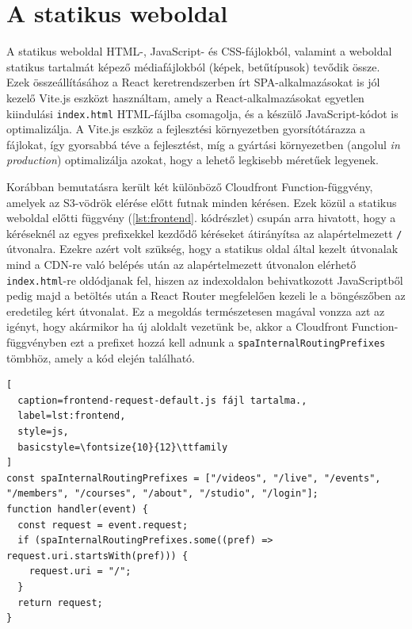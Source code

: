 \section{A statikus weboldal}

A statikus weboldal HTML-, JavaScript- és CSS-fájlokból, valamint a weboldal statikus tartalmát képező médiafájlokból (képek, betűtípusok) tevődik össze. Ezek összeállításához a React keretrendszerben írt SPA-alkalmazásokat is jól kezelő Vite.js eszközt használtam, amely a React-alkalmazásokat egyetlen kiindulási \verb|index.html| HTML-fájlba csomagolja, és a készülő JavaScript-kódot is optimalizálja. A Vite.js eszköz a fejlesztési környezetben gyorsítótárazza a fájlokat, így gyorsabbá téve a fejlesztést, míg a gyártási környezetben (angolul \emph{in production}) optimalizálja azokat, hogy a lehető legkisebb méretűek legyenek.

Korábban bemutatásra került két különböző Cloudfront Function-függvény, amelyek az S3-vödrök elérése előtt futnak minden kérésen. Ezek közül a statikus weboldal előtti függvény (\ref{lst:frontend}. kódrészlet) csupán arra hivatott, hogy a kéréseknél az egyes prefixekkel kezdődő kéréseket átirányítsa az alapértelmezett \verb|/| útvonalra. Ezekre azért volt szükség, hogy a statikus oldal által kezelt útvonalak mind a CDN-re való belépés után az alapértelmezett útvonalon elérhető \verb|index.html|-re oldódjanak fel, hiszen az indexoldalon behivatkozott JavaScriptből pedig majd a betöltés után a React Router megfelelően kezeli le a böngészőben az eredetileg kért útvonalat. Ez a megoldás természetesen magával vonzza azt az igényt, hogy akármikor ha új aloldalt vezetünk be, akkor a Cloudfront Function-függvényben ezt a prefixet hozzá kell adnunk a \verb|spaInternalRoutingPrefixes| tömbhöz, amely a kód elején található.

\begin{minipage}{0.92\textwidth}
  \begin{lstlisting}[
  caption=frontend-request-default.js fájl tartalma.,
  label=lst:frontend,
  style=js,
  basicstyle=\fontsize{10}{12}\ttfamily
]
const spaInternalRoutingPrefixes = ["/videos", "/live", "/events", "/members", "/courses", "/about", "/studio", "/login"];
function handler(event) {
  const request = event.request;
  if (spaInternalRoutingPrefixes.some((pref) => request.uri.startsWith(pref))) {
    request.uri = "/";
  }
  return request;
}
\end{lstlisting}
\end{minipage}

